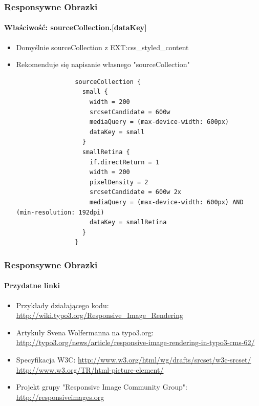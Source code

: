 
\begin{frame}[fragile]
	\frametitle{Responsywne Obrazki}
	\framesubtitle{Właściwość: sourceCollection.[dataKey]}

	\begin{itemize}
		\item Domyślnie sourceCollection z EXT:css\_styled\_content
		\item Rekomenduje się napisanie własnego "sourceCollection"

			\lstset{
				basicstyle=\tiny\ttfamily
			}

			\begin{lstlisting}
				sourceCollection {
				  small {
				    width = 200
				    srcsetCandidate = 600w
				    mediaQuery = (max-device-width: 600px)
				    dataKey = small
				  }
				  smallRetina {
				    if.directReturn = 1
				    width = 200
				    pixelDensity = 2
				    srcsetCandidate = 600w 2x
				    mediaQuery = (max-device-width: 600px) AND (min-resolution: 192dpi)
				    dataKey = smallRetina
				  }
				}
			\end{lstlisting}
	\end{itemize}

\end{frame}


\begin{frame}[fragile]
	\frametitle{Responsywne Obrazki}
	\framesubtitle{Przydatne linki}

	\begin{itemize}
		\item Przykłady działającego kodu:\newline
			\small\url{http://wiki.typo3.org/Responsive_Image_Rendering}\normalsize

		\item Artykuły Svena Wolfermanna na typo3.org:\newline
			\small\url{http://typo3.org/news/article/responsive-image-rendering-in-typo3-cms-62/}\normalsize

		\item Specyfikacja W3C:\newline
			\small\url{http://www.w3.org/html/wg/drafts/srcset/w3c-srcset/}\newline
			\small\url{http://www.w3.org/TR/html-picture-element/}

		\item Projekt grupy "Responsive Image Community Group":\newline
			\small\url{http://responsiveimages.org}\normalsize

	\end{itemize}

\end{frame}


